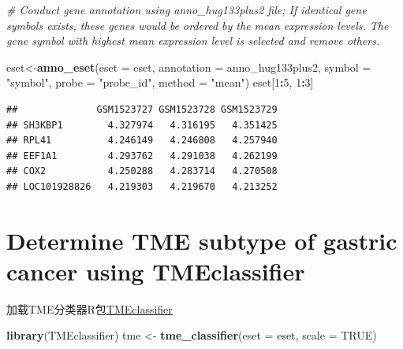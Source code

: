 \documentclass[
  12pt,
]{book}
\newenvironment{Shaded}{\begin{snugshade}}{\end{snugshade}}
\newcommand{\AttributeTok}[1]{\textcolor[rgb]{0.13,0.29,0.53}{#1}}
\newcommand{\CommentTok}[1]{\textcolor[rgb]{0.56,0.35,0.01}{\textit{#1}}}
\newcommand{\ConstantTok}[1]{\textcolor[rgb]{0.56,0.35,0.01}{#1}}
\newcommand{\DecValTok}[1]{\textcolor[rgb]{0.00,0.00,0.81}{#1}}
\newcommand{\FunctionTok}[1]{\textcolor[rgb]{0.13,0.29,0.53}{\textbf{#1}}}
\newcommand{\NormalTok}[1]{#1}
\newcommand{\OtherTok}[1]{\textcolor[rgb]{0.56,0.35,0.01}{#1}}
\newcommand{\SpecialCharTok}[1]{\textcolor[rgb]{0.81,0.36,0.00}{\textbf{#1}}}
\newcommand{\StringTok}[1]{\textcolor[rgb]{0.31,0.60,0.02}{#1}}
\begin{document}
\begin{Shaded}
\begin{Highlighting}[]
\CommentTok{\# Conduct gene annotation using \textasciigrave{}anno\_hug133plus2\textasciigrave{} file; If identical gene symbols exists, these genes would be ordered by the mean expression levels. The gene symbol with highest mean expression level is selected and remove others. }

\NormalTok{eset}\OtherTok{\textless{}{-}}\FunctionTok{anno\_eset}\NormalTok{(}\AttributeTok{eset       =}\NormalTok{ eset,}
                \AttributeTok{annotation =}\NormalTok{ anno\_hug133plus2,}
                \AttributeTok{symbol     =} \StringTok{"symbol"}\NormalTok{,}
                \AttributeTok{probe      =} \StringTok{"probe\_id"}\NormalTok{,}
                \AttributeTok{method     =} \StringTok{"mean"}\NormalTok{)}
\NormalTok{eset[}\DecValTok{1}\SpecialCharTok{:}\DecValTok{5}\NormalTok{, }\DecValTok{1}\SpecialCharTok{:}\DecValTok{3}\NormalTok{]}
\end{Highlighting}
\end{Shaded}

\begin{verbatim}
##              GSM1523727 GSM1523728 GSM1523729
## SH3KBP1        4.327974   4.316195   4.351425
## RPL41          4.246149   4.246808   4.257940
## EEF1A1         4.293762   4.291038   4.262199
## COX2           4.250288   4.283714   4.270508
## LOC101928826   4.219303   4.219670   4.213252
\end{verbatim}

\hypertarget{determine-tme-subtype-of-gastric-cancer-using-tmeclassifier}{%
\section{Determine TME subtype of gastric cancer using TMEclassifier}\label{determine-tme-subtype-of-gastric-cancer-using-tmeclassifier}}

加载TME分类器R包\href{https://github.com/LiaoWJLab/TMEclassifier}{TMEclassifier}

\begin{Shaded}
\begin{Highlighting}[]
\FunctionTok{library}\NormalTok{(TMEclassifier)}
\NormalTok{tme }\OtherTok{\textless{}{-}} \FunctionTok{tme\_classifier}\NormalTok{(}\AttributeTok{eset =}\NormalTok{ eset, }\AttributeTok{scale =} \ConstantTok{TRUE}\NormalTok{)}
\end{Highlighting}
\end{Shaded}
\end{document}
